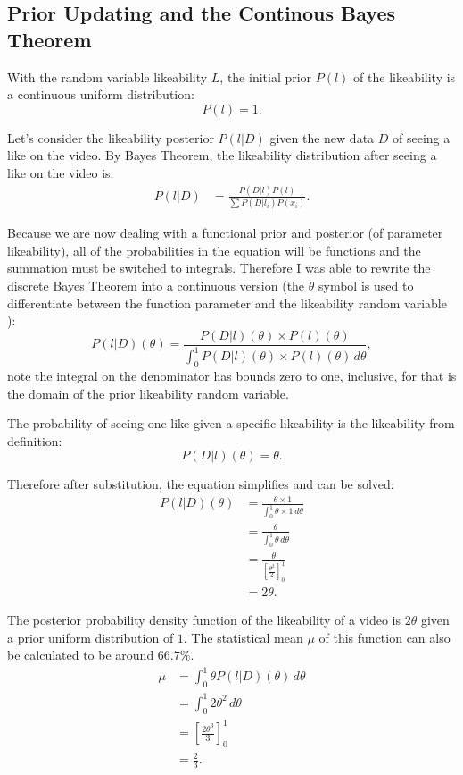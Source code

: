 \documentclass[a4paper,11pt]{article}
\newcommand*\Eval[3]{\left[#1\right]_{#3}^{#2}}
\begin{document}
\subsection{Prior Updating and the Continous Bayes Theorem}
With the random variable likeability $L$, the initial prior $P(l)$ of the likeability is a continuous uniform distribution:
\[
    P(l) = 1.
\]

Let's consider the likeability posterior $P(l|D)$ given the new data $D$ of seeing a like on the video. By Bayes Theorem, the likeability distribution after seeing a like on the video is:
\begin{align*}
    P(l|D) &= \frac{P(D|l) P(l)}{\sum P(D|l_i) P(x_i) }.
\end{align*}

Because we are now dealing with a functional prior and posterior (of parameter likeability), all of the probabilities in the equation will be functions and the summation must be switched to integrals. Therefore I was able to rewrite the discrete Bayes Theorem into a continuous version (the $\theta$ symbol is used to differentiate between the function parameter and the likeability random variable ):
\[
    P(l|D)(\theta) = \frac{P(D|l)(\theta) \times P(l)(\theta)}{\int_{0}^{1} P(D|l)(\theta) \times P(l)(\theta) \, d\theta},
\]
note the integral on the denominator has bounds zero to one, inclusive, for that is the domain of the prior likeability random variable.

The probability of seeing one like given a specific likeability is the likeability from definition:
\[
    P(D|l)(\theta) = \theta.
\]

Therefore after substitution, the equation simplifies and can be solved:
\begin{align*}
    P(l|D)(\theta) &= \frac{\theta \times 1}{\int_{0}^{1} \theta \times 1 \, d\theta}\\
    &= \frac{\theta}{\int_0^1 \theta \, d\theta}\\
    &= \frac{\theta}{\Eval{\frac{\theta^2}{2}}{1}{0}}\\
    &= 2\theta.
\end{align*}

\newpage
The posterior probability density function of the likeability of a video is $2\theta$ given a prior uniform distribution of $1$. The statistical mean $\mu$ of this function can also be calculated to be around $66.7\%$.
\begin{align*}
    \mu &= \int_0^1 \theta P(l|D)(\theta) \, d\theta\\
    &= \int_0^1 2\theta^2 \, d\theta\\
    &= \Eval{\frac{2\theta^3}{3}}{1}{0}\\
    &= \frac{2}{3}.
\end{align*}
\end{document}
